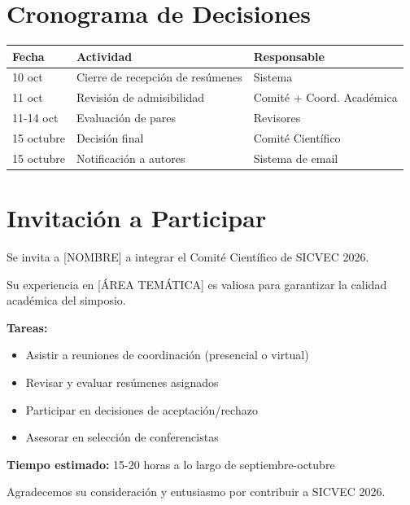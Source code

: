 \documentclass[12pt,a4paper]{article}
\begin{document}
\section*{Cronograma de Decisiones}

\begin{tabular}{|l|l|l|}
\hline
\textbf{Fecha} & \textbf{Actividad} & \textbf{Responsable} \\
\hline
10 oct & Cierre de recepción de resúmenes & Sistema \\
11 oct & Revisión de admisibilidad & Comité + Coord. Académica \\
11-14 oct & Evaluación de pares & Revisores \\
15 octubre & Decisión final & Comité Científico \\
15 octubre & Notificación a autores & Sistema de email \\
\hline
\end{tabular}

\vspace{0.5cm}

\section*{Invitación a Participar}

Se invita a [NOMBRE] a integrar el Comité Científico de SICVEC 2026.

Su experiencia en [ÁREA TEMÁTICA] es valiosa para garantizar la calidad académica del simposio.

\textbf{Tareas:}
\begin{itemize}
  \item Asistir a reuniones de coordinación (presencial o virtual)
  \item Revisar y evaluar resúmenes asignados
  \item Participar en decisiones de aceptación/rechazo
  \item Asesorar en selección de conferencistas
\end{itemize}

\textbf{Tiempo estimado:} 15-20 horas a lo largo de septiembre-octubre

\vspace{0.5cm}

Agradecemos su consideración y entusiasmo por contribuir a SICVEC 2026.
\end{document}
